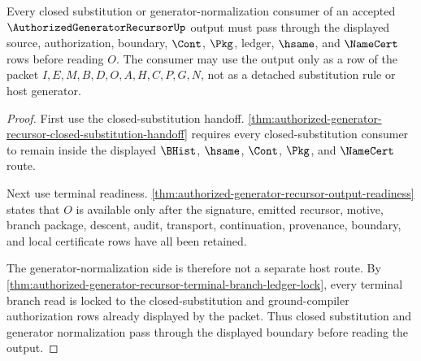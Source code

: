 \begin{theorem}
\label{thm:authorized-generator-recursor-boundary-closure}
Every closed substitution or generator-normalization consumer of an accepted $\AuthorizedGeneratorRecursorUp$ output must pass through the displayed source, authorization, boundary, $\Cont$, $\Pkg$, ledger, $\hsame$, and $\NameCert$ rows before reading $O$. The consumer may use the output only as a row of the packet $I,E,M,B,D,O,A,H,C,P,G,N$, not as a detached substitution rule or host generator.
\end{theorem}
\begin{proof}
First use the closed-substitution handoff. \autoref{thm:authorized-generator-recursor-closed-substitution-handoff} requires every closed-substitution consumer to remain inside the displayed $\BHist$, $\hsame$, $\Cont$, $\Pkg$, and $\NameCert$ route.

Next use terminal readiness. \autoref{thm:authorized-generator-recursor-output-readiness} states that $O$ is available only after the signature, emitted recursor, motive, branch package, descent, audit, transport, continuation, provenance, boundary, and local certificate rows have all been retained.

The generator-normalization side is therefore not a separate host route. By \autoref{thm:authorized-generator-recursor-terminal-branch-ledger-lock}, every terminal branch read is locked to the closed-substitution and ground-compiler authorization rows already displayed by the packet. Thus closed substitution and generator normalization pass through the displayed boundary before reading the output.
\end{proof}

